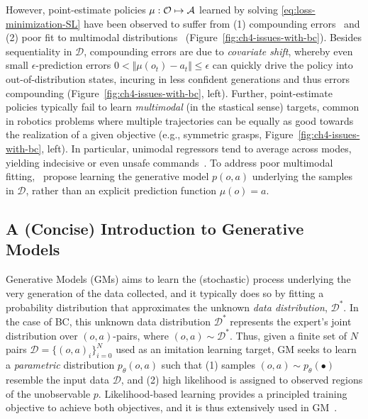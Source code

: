 However, point-estimate policies \( \mu : \mathcal O \mapsto \mathcal A \) learned by solving \ref{eq:loss-minimization-SL} have been observed to suffer from (1) compounding errors~\citep{rossReductionImitationLearning2011} and (2) poor fit to multimodal distributions~\citep{florenceImplicitBehavioralCloning2022, keGraspingChopsticksCombating2020} (Figure~\ref{fig:ch4-issues-with-bc}).
Besides sequentiality in \( \mathcal D \), compounding errors are due to \emph{covariate shift}, whereby even small \( \epsilon \)-prediction errors \( 0 < \Vert \mu(o_t) - a_t \Vert \leq \epsilon \) can quickly drive the policy into out-of-distribution states, incuring in less confident generations and thus errors compounding (Figure~\ref{fig:ch4-issues-with-bc}, left).
Further, point-estimate policies typically fail to learn \emph{multimodal} (in the stastical sense) targets, common in robotics problems where multiple trajectories can be equally as good towards the realization of a given objective (e.g.,  symmetric grasps, Figure~\ref{fig:ch4-issues-with-bc}, left). 
In particular, unimodal regressors tend to average across modes, yielding indecisive or even unsafe commands~\citep{florenceImplicitBehavioralCloning2022}.
To address poor multimodal fitting,~\citet{florenceImplicitBehavioralCloning2022} propose learning the generative model \( p(o, a) \) underlying the samples in \( \mathcal D \), rather than an explicit prediction function \( \mu(o) = a \).

\subsection{A (Concise) Introduction to Generative Models}
Generative Models (GMs) aims to learn the (stochastic) process underlying the very generation of the data collected, and it typically does so by fitting a probability distribution that approximates the unknown \emph{data distribution}, \( \mathcal D^* \).
In the case of BC, this unknown data distribution \( \mathcal D^* \) represents the expert's joint distribution over \( (o, a) \)-pairs, where \( (o,a) \sim \mathcal D^* \).
Thus, given a finite set of \( N \) pairs \(\mathcal D = \{ (o,a)_i \}_{i=0}^N\) used as an imitation learning target, GM seeks to learn a \emph{parametric} distribution \( p_\theta(o,a) \) such that (1) samples \( (o,a) \sim p_\theta(\bullet) \) resemble the input data \( \mathcal D \), and (2) high likelihood is assigned to observed regions of the unobservable \( p \).
Likelihood-based learning provides a principled training objective to achieve both objectives, and it is thus extensively used in GM~\citep{prince2023understanding}.

